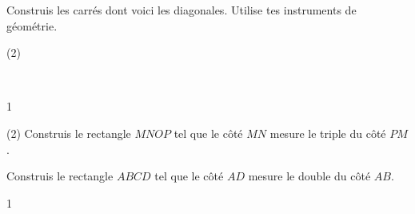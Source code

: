 \documentclass[a4paper,11pt]{report}
\begin{document}
\begin{exop}{
Construis les carrés dont voici les diagonales. Utilise tes instruments de géométrie.

\begin{tasks}(2)
    \task ~\vspace{2cm} \\
    
    
    \task ~\vspace{1cm} \\
    
        \hspace{3cm}
\end{tasks}

\vspace{2cm}

}{1}
\end{exop}


\begin{exop}{
\begin{tasks}(2)
\task Construis le rectangle $MNOP$ tel que le côté $MN$ mesure le triple du côté $PM$. \vspace{1cm} \\
\vspace{3cm}

\task Construis le rectangle $ABCD$ tel que le côté $AD$ mesure le double du côté $AB$. \vspace{1cm} \\
\vspace{3cm}
\end{tasks}
}{1}
\end{exop}
\end{document}
